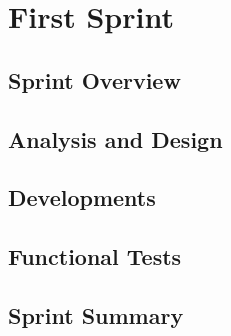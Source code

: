 \chapter{First Sprint}\label{chap:sprint1}

\section{Sprint Overview}\label{sec:sprint1:overview}


\section{Analysis and Design}\label{sec:sprint1:analysis}




\section{Developments}\label{sec:sprint1:developments}


%




\section{Functional Tests}\label{sec:sprint1:testing}



\section{Sprint Summary}\label{sec:sprint1:review}
